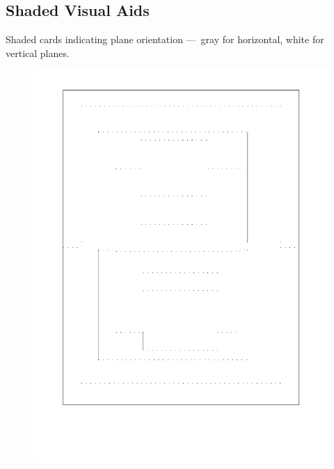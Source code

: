 \clearpage

\subsection{Shaded Visual Aids}\label{shaded-visual-aids}

Shaded cards indicating plane orientation ---~gray for horizontal, white
for vertical planes.

\begin{figure}[htbp]
\centering
\includegraphics{figures/92_Appendix_Visual_Aids_Materials/shaded_card1.png}
\caption{}
\end{figure}


